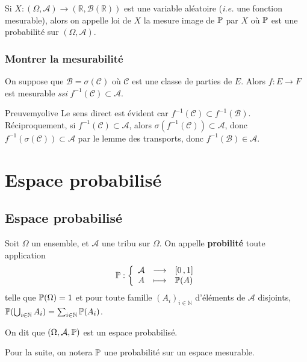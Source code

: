     Si $X : (\Omega, \mathcal{A}) \to (\mathbb{R}, \mathcal{B}(\mathbb{R}))$ est une variable aléatoire (\textit{i.e.} une fonction mesurable), alors on appelle loi de $X$ la mesure image de $\P$ par $X$ où $\P$ est une probabilité sur $(\Omega, \mathcal{A})$.

    \subsubsection{Montrer la mesurabilité}

    \begin{prop}{}{}
        On suppose que $\mathcal{B} = \sigma(\mathcal{C})$ où $\mathcal{C}$ est une classe de parties de $E$. Alors $f : E \to F$ est mesurable \textit{ssi} $f^{-1}(\mathcal{C}) \subset \mathcal{A}$.
    \end{prop}

    \begin{demo}{Preuve}{myolive}
        Le sens direct est évident car $f^{-1}(\mathcal{C}) \subset f^{-1}(\mathcal{B})$. Réciproquement, si $f^{-1}(\mathcal{C}) \subset \mathcal{A}$, alors $\sigma(f^{-1}(\mathcal{C})) \subset \mathcal{A}$, donc $f^{-1}(\sigma(\mathcal{C})) \subset \mathcal{A}$ par le lemme des transports, donc $f^{-1}(\mathcal{B}) \in \mathcal{A}$.
    \end{demo}



\section{Espace probabilisé}

    \subsection{Espace probabilisé}

    \begin{defi}{}{}
        Soit $\Omega$ un ensemble, et $\mathcal{A}$ une tribu sur $\Omega$. On appelle \textbf{probilité} toute application 
        \[ \fonction{\P}{\mathcal{A}}{\intervalleFF{0}{1}}{A}{\P(A)} \]   
        telle que $\P(\Omega) = 1$ et pour toute famille $(A_i)_{i \in \mathbb{N}}$ d’éléments de $\mathcal{A}$ disjoints, $\P(\bigcup_{i \in \mathbb{N}} A_i) = \sum_{i \in \mathbb{N}} \P(A_i)$. 

        On dit que $(\Omega, \mathcal{A}, \P)$ est un espace probabilisé. 
    \end{defi}

    Pour la suite, on notera $\P$ une probabilité sur un espace mesurable.

